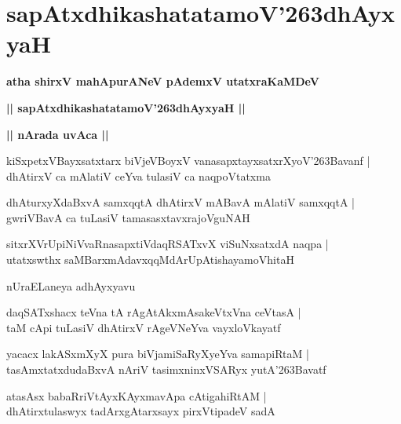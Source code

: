 \documentclass[twoside,12pt,openright]{book}
\def\S{\char'263}
\newcounter{shloka}[chapter]
\def\uvaca#1{\centerline{{\large\textbf{#1}}}}
\begin{document}
\chapter{sapAtxdhikashatatamoV\S dhAyxyaH}

\begin{center}
{\LARGE\bfseries atha shirxV mahApurANeV pAdemxV utatxraKaMDeV}
\end{center}

\begin{center}
{\LARGE\bfseries || sapAtxdhikashatatamoV\S dhAyxyaH || }
\end{center}

\uvaca{|| nArada uvAca ||}

\begin{shloka}%
kiSxpetxVBayxsatxtarx biVjeVBoyxV vanasapxtayxsatxrXyoV\S Bavanf |\\
dhAtirxV ca mAlatiV ceYva tulasiV ca naqpoVtatxma
\end{shloka}

\begin{shloka}%
dhAturxyXdaBxvA samxqqtA dhAtirxV mABavA mAlatiV samxqqtA |\\
gwriVBavA ca tuLasiV tamasasxtavxrajoVguNAH 
\end{shloka}

\begin{shloka}%
sitxrXVrUpiNiVvaRnasapxtiVdaqRSATxvX viSuNxsatxdA naqpa |\\
utatxswthx saMBarxmAdavxqqMdArUpAtishayamoVhitaH 
\end{shloka}

\begin{center}
nUraELaneya adhAyxyavu 
\end{center}

\begin{shloka}%
daqSATxshacx teVna tA rAgAtAkxmAsakeVtxVna ceVtasA |\\
taM cApi tuLasiV dhAtirxV rAgeVNeYva vayxloVkayatf 
\end{shloka}

\begin{shloka}%
yacacx lakASxmXyX pura biVjamiSaRyXyeYva samapiRtaM |\\
tasAmxtatxdudaBxvA nAriV tasimxninxVSARyx yutA\S Bavatf 
\end{shloka}

\begin{shloka}%
atasAsx babaRriVtAyxKAyxmavApa cAtigahiRtAM |\\
dhAtirxtulaswyx tadArxgAtarxsayx pirxVtipadeV sadA 
\end{shloka}
\end{document}
